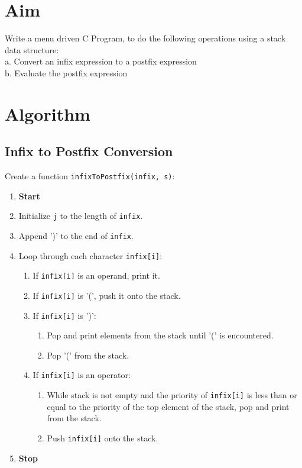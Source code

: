 
\section{Aim}
Write a menu driven C Program, to do the following operations using a stack data structure:
\\a. Convert an infix expression to a postfix expression
\\b. Evaluate the postfix expression

\section{Algorithm}
 {\selectfont

  \subsection{Infix to Postfix Conversion}
  Create a function \texttt{infixToPostfix(infix, s)}:
  \begin{enumerate}[label=\arabic*:,left=0pt]
    \item \textbf{Start}
    \item Initialize \texttt{j} to the length of \texttt{infix}.
    \item Append ')' to the end of \texttt{infix}.
    \item Loop through each character \texttt{infix[i]}:
          \begin{enumerate}[label=2.\arabic*.]
            \item If \texttt{infix[i]} is an operand, print it.
            \item If \texttt{infix[i]} is '(', push it onto the stack.
            \item If \texttt{infix[i]} is ')':
                  \begin{enumerate}[label=2.3.\arabic*.]
                    \item Pop and print elements from the stack until '(' is encountered.
                    \item Pop '(' from the stack.
                  \end{enumerate}
            \item If \texttt{infix[i]} is an operator:
                  \begin{enumerate}[label=2.4.\arabic*.]
                    \item While stack is not empty and the priority of \texttt{infix[i]} is less than or equal \newline to the priority of the top element of the stack, pop and print from the stack.
                    \item Push \texttt{infix[i]} onto the stack.
                  \end{enumerate}
          \end{enumerate}
    \item \textbf{Stop}
  \end{enumerate}

}
